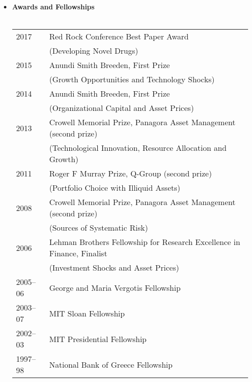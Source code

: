 \documentclass[11pt,letterpaper,serif,overlapped]{res}
\begin{document}
\begin{resume}
\begin{itemize}
\item \textbf{Awards and Fellowships}\\ \\
\begin{tabular}{ll}
2017 & Red Rock Conference Best Paper Award \\ &  (Developing Novel Drugs)\\
2015 & Anundi Smith Breeden, First Prize\\ &  (Growth Opportunities and Technology Shocks)\\
2014 & Anundi Smith Breeden, First Prize \\ & (Organizational Capital and Asset Prices)\\
2013 & Crowell Memorial Prize, Panagora Asset Management (second prize)\\& (Technological Innovation, Resource Allocation and Growth)\\
2011 & Roger F Murray Prize, Q-Group (second prize)\\ & (Portfolio Choice with Illiquid Assets)\\
2008 & Crowell Memorial Prize, Panagora Asset Management (second prize) \\ & (Sources of Systematic Risk) \\
2006  & Lehman Brothers Fellowship for Research Excellence in Finance, Finalist\\ & (Investment Shocks and Asset Prices)\\
2005--06 & George and Maria Vergotis Fellowship\\
2003--07 & MIT Sloan Fellowship\\
2002--03 & MIT Presidential Fellowship\\
1997--98 & National Bank of Greece Fellowship \\
\end{tabular}

\end{itemize}



\end{resume}
\end{document}
